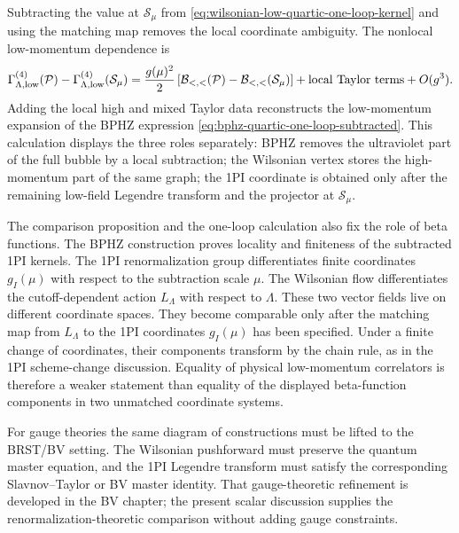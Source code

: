 Subtracting the value at \(\mathcal S_\mu\) from
\eqref{eq:wilsonian-low-quartic-one-loop-kernel} and using the matching map
removes the local coordinate ambiguity.  The nonlocal low-momentum dependence
is
\[
  \Gamma^{(4)}_{\Lambda,{\rm low}}(\mathcal P)
  -
  \Gamma^{(4)}_{\Lambda,{\rm low}}(\mathcal S_\mu)
  =
  \frac{g(\mu)^2}{2}
  \left[
    \mathcal B_{<,<}(\mathcal P)
    -
    \mathcal B_{<,<}(\mathcal S_\mu)
  \right]
  +
  \hbox{local Taylor terms}
  +
  O(g^3).
\]
Adding the local high and mixed Taylor data reconstructs the low-momentum
expansion of the BPHZ expression
\eqref{eq:bphz-quartic-one-loop-subtracted}.  This calculation displays the
three roles separately: BPHZ removes the ultraviolet part of the full bubble
by a local subtraction; the Wilsonian vertex stores the high-momentum part of
the same graph; the 1PI coordinate is obtained only after the remaining
low-field Legendre transform and the projector at \(\mathcal S_\mu\).

The comparison proposition and the one-loop calculation also fix the role of
beta functions.  The BPHZ construction
proves locality and finiteness of the subtracted 1PI kernels.  The 1PI
renormalization group differentiates finite coordinates \(g_I(\mu)\) with
respect to the subtraction scale \(\mu\).  The Wilsonian flow differentiates
the cutoff-dependent action \(L_\Lambda\) with respect to \(\Lambda\).  These
two vector fields live on different coordinate spaces.  They become comparable
only after the matching map from \(L_\Lambda\) to the 1PI coordinates
\(g_I(\mu)\) has been specified.  Under a finite change of coordinates,
their components transform by the chain rule, as in the 1PI scheme-change
discussion.  Equality of physical low-momentum correlators is therefore a
weaker statement than equality of the displayed beta-function components in
two unmatched coordinate systems.

For gauge theories the same diagram of constructions must be lifted to the
BRST/BV setting.  The Wilsonian pushforward must preserve the quantum master
equation, and the 1PI Legendre transform must satisfy the corresponding
Slavnov--Taylor or BV master identity.  That gauge-theoretic refinement is
developed in the BV chapter; the present scalar discussion supplies the
renormalization-theoretic comparison without adding gauge constraints.
